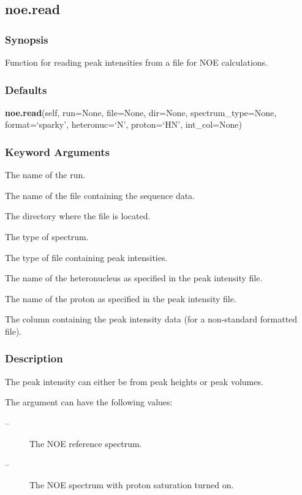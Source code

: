 \newpage

\subsection{noe.read}


\subsubsection{Synopsis}

Function for reading peak intensities from a file for NOE calculations.

\subsubsection{Defaults}

\textsf{\textbf{noe.read}(self, run=None, file=None, dir=None, spectrum\_type=None, format=`sparky', heteronuc=`N', proton=`HN', int\_col=None)}


\subsubsection{Keyword Arguments}


  The name of the run.

  The name of the file containing the sequence  data.

  The directory where the file is located.

  The type of spectrum.

  The type of file containing peak intensities.

  The name of the heteronucleus as specified in the peak intensity file.

  The name of the proton as specified in the peak intensity file.

  The column containing the peak intensity data (for a non-standard formatted file).

\subsubsection{Description}

The peak intensity can either be from peak heights or peak volumes.


The 
 argument can have the following values:
\begin{description}
\item[    
 --]   The NOE reference spectrum.
\item[    
 --]   The NOE spectrum with proton saturation turned on.
\end{description}


